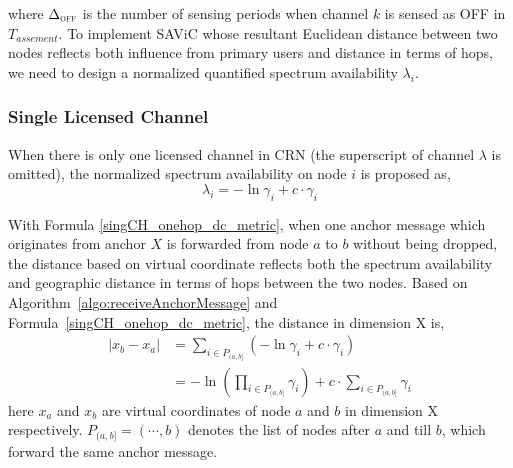 where $\Delta_{\textsc{\tiny OFF}}$ is the number of sensing periods when channel $k$ is sensed as OFF in $T_{assement}$.
To implement SAViC whose resultant Euclidean distance between two nodes reflects both influence from primary users and distance in terms of hops, we need to design a normalized quantified spectrum availability $\lambda_i$.

\subsubsection{Single Licensed Channel}
When there is only one licensed channel in CRN (the superscript of channel $\lambda$ is omitted), the normalized spectrum availability on node $i$ is proposed as,%
\begin{equation}
\lambda_i = -\ln \gamma_i+ c \cdot \gamma_i
\label{singCH_onehop_dc_metric}
\end{equation}

With Formula \ref{singCH_onehop_dc_metric}, when one anchor message which originates from anchor $X$ is forwarded from node $a$ to $b$ without being dropped, the distance based on virtual coordinate reflects both the spectrum availability and geographic distance in terms of hops between the two nodes.
Based on Algorithm~\ref{algo:receiveAnchorMessage} and Formula~\ref{singCH_onehop_dc_metric}, the distance in dimension X is, 
\begin{equation}\label{distance}
\begin{split}
|x_b-x_a| & =  \sum_{i\in P_{(a,b]}} (-\ln\gamma_i + c\cdot \gamma_i) \\
		  & = -\ln(\prod_{i\in P_{(a,b]}} \gamma_i) + c\cdot \sum_{i\in P_{(a,b]}} \gamma_i
\end{split}
\end{equation}
here $x_a$ and $x_b$ are virtual coordinates of node $a$ and $b$ in dimension X respectively.
$P_{(a,b]}=(\cdots, b)$ denotes the list of nodes after $a$ and till $b$, which forward the same anchor message.

